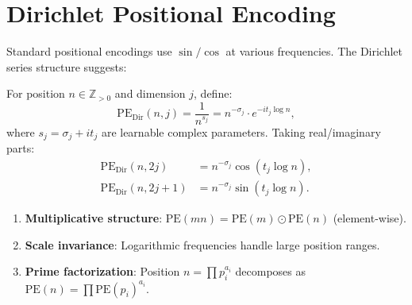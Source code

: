 \begin{center}
\end{center}

\section{Dirichlet Positional Encoding}

Standard positional encodings use $\sin/\cos$ at various frequencies. The Dirichlet series structure suggests:

\begin{definition}
  For position $n \in \mathbb{Z}_{>0}$ and dimension $j$, define:
  \begin{equation}
    \text{PE}_{\text{Dir}}(n, j) = \frac{1}{n^{s_j}} = n^{-\sigma_j} \cdot e^{-i t_j \log n},
  \end{equation}
  where $s_j = \sigma_j + i t_j$ are learnable complex parameters. Taking real/imaginary parts:
  \begin{align}
    \text{PE}_{\text{Dir}}(n, 2j)   & = n^{-\sigma_j} \cos(t_j \log n), \\
    \text{PE}_{\text{Dir}}(n, 2j+1) & = n^{-\sigma_j} \sin(t_j \log n).
  \end{align}
\end{definition}

\begin{proposition}
  \begin{enumerate}
    \item \textbf{Multiplicative structure}: $\text{PE}(mn) = \text{PE}(m) \odot \text{PE}(n)$ (element-wise).
    \item \textbf{Scale invariance}: Logarithmic frequencies handle large position ranges.
    \item \textbf{Prime factorization}: Position $n = \prod p_i^{a_i}$ decomposes as $\text{PE}(n) = \prod \text{PE}(p_i)^{a_i}$.
  \end{enumerate}
\end{proposition}

